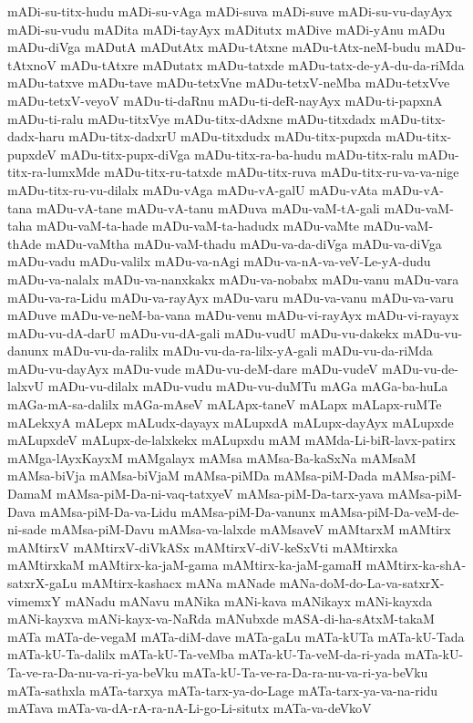 {mADi-su-titx-hudu
mADi-su-vAga
mADi-suva
mADi-suve
mADi-su-vu-dayAyx
mADi-su-vudu
mADita
mADi-tayAyx
mADitutx
mADive
mADi-yAnu
mADu
mADu-diVga
mADutA
mADutAtx
mADu-tAtxne
mADu-tAtx-neM-budu
mADu-tAtxnoV
mADu-tAtxre
mADutatx
mADu-tatxde
mADu-tatx-de-yA-du-da-riMda
mADu-tatxve
mADu-tave
mADu-tetxVne
mADu-tetxV-neMba
mADu-tetxVve
mADu-tetxV-veyoV
mADu-ti-daRnu
mADu-ti-deR-nayAyx
mADu-ti-papxnA
mADu-ti-ralu
mADu-titxVye
mADu-titx-dAdxne
mADu-titxdadx
mADu-titx-dadx-haru
mADu-titx-dadxrU
mADu-titxdudx
mADu-titx-pupxda
mADu-titx-pupxdeV
mADu-titx-pupx-diVga
mADu-titx-ra-ba-hudu
mADu-titx-ralu
mADu-titx-ra-lumxMde
mADu-titx-ru-tatxde
mADu-titx-ruva
mADu-titx-ru-va-va-nige
mADu-titx-ru-vu-dilalx
mADu-vAga
mADu-vA-galU
mADu-vAta
mADu-vA-tana
mADu-vA-tane
mADu-vA-tanu
mADuva
mADu-vaM-tA-gali
mADu-vaM-taha
mADu-vaM-ta-hade
mADu-vaM-ta-hadudx
mADu-vaMte
mADu-vaM-thAde
mADu-vaMtha
mADu-vaM-thadu
mADu-va-da-diVga
mADu-va-diVga
mADu-vadu
mADu-valilx
mADu-va-nAgi
mADu-va-nA-va-veV-Le-yA-dudu
mADu-va-nalalx
mADu-va-nanxkakx
mADu-va-nobabx
mADu-vanu
mADu-vara
mADu-va-ra-Lidu
mADu-va-rayAyx
mADu-varu
mADu-va-vanu
mADu-va-varu
mADuve
mADu-ve-neM-ba-vana
mADu-venu
mADu-vi-rayAyx
mADu-vi-rayayx
mADu-vu-dA-darU
mADu-vu-dA-gali
mADu-vudU
mADu-vu-dakekx
mADu-vu-danunx
mADu-vu-da-ralilx
mADu-vu-da-ra-lilx-yA-gali
mADu-vu-da-riMda
mADu-vu-dayAyx
mADu-vude
mADu-vu-deM-dare
mADu-vudeV
mADu-vu-de-lalxvU
mADu-vu-dilalx
mADu-vudu
mADu-vu-duMTu
mAGa
mAGa-ba-huLa
mAGa-mA-sa-dalilx
mAGa-mAseV
mALApx-taneV
mALapx
mALapx-ruMTe
mALekxyA
mALepx
mALudx-dayayx
mALupxdA
mALupx-dayAyx
mALupxde
mALupxdeV
mALupx-de-lalxkekx
mALupxdu
mAM
mAMda-Li-biR-lavx-patirx
mAMga-lAyxKayxM
mAMgalayx
mAMsa
mAMsa-Ba-kaSxNa
mAMsaM
mAMsa-biVja
mAMsa-biVjaM
mAMsa-piMDa
mAMsa-piM-Dada
mAMsa-piM-DamaM
mAMsa-piM-Da-ni-vaq-tatxyeV
mAMsa-piM-Da-tarx-yava
mAMsa-piM-Dava
mAMsa-piM-Da-va-Lidu
mAMsa-piM-Da-vanunx
mAMsa-piM-Da-veM-de-ni-sade
mAMsa-piM-Davu
mAMsa-va-lalxde
mAMsaveV
mAMtarxM
mAMtirx
mAMtirxV
mAMtirxV-diVkASx
mAMtirxV-diV-keSxVti
mAMtirxka
mAMtirxkaM
mAMtirx-ka-jaM-gama
mAMtirx-ka-jaM-gamaH
mAMtirx-ka-shA-satxrX-gaLu
mAMtirx-kashacx
mANa
mANade
mANa-doM-do-La-va-satxrX-vimemxY
mANadu
mANavu
mANika
mANi-kava
mANikayx
mANi-kayxda
mANi-kayxva
mANi-kayx-va-NaRda
mANubxde
mASA-di-ha-sAtxM-takaM
mATa
mATa-de-vegaM
mATa-diM-dave
mATa-gaLu
mATa-kUTa
mATa-kU-Tada
mATa-kU-Ta-dalilx
mATa-kU-Ta-veMba
mATa-kU-Ta-veM-da-ri-yada
mATa-kU-Ta-ve-ra-Da-nu-va-ri-ya-beVku
mATa-kU-Ta-ve-ra-Da-ra-nu-va-ri-ya-beVku
mATa-sathxla
mATa-tarxya
mATa-tarx-ya-do-Lage
mATa-tarx-ya-va-na-ridu
mATava
mATa-va-dA-rA-ra-nA-Li-go-Li-situtx
mATa-va-deVkoV
}
